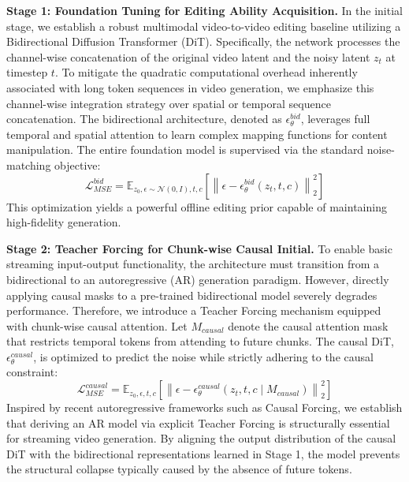 \noindent \textbf{Stage 1: Foundation Tuning for Editing Ability Acquisition.}
In the initial stage, we establish a robust multimodal video-to-video editing baseline utilizing a Bidirectional Diffusion Transformer (DiT). Specifically, the network processes the channel-wise concatenation of the original video latent and the noisy latent $z_t$ at timestep $t$. To mitigate the quadratic computational overhead inherently associated with long token sequences in video generation, we emphasize this channel-wise integration strategy over spatial or temporal sequence concatenation. The bidirectional architecture, denoted as $\epsilon_{\theta}^{bid}$, leverages full temporal and spatial attention to learn complex mapping functions for content manipulation. The entire foundation model is supervised via the standard noise-matching objective:
$$\mathcal{L}_{MSE}^{bid}=\mathbb{E}_{z_0,\epsilon\sim\mathcal{N}(0,I),t,c}\left[\left\|\epsilon-\epsilon_{\theta}^{bid}(z_t,t,c)\right\|_2^2\right]$$
This optimization yields a powerful offline editing prior capable of maintaining high-fidelity generation.

\noindent \textbf{Stage 2: Teacher Forcing for Chunk-wise Causal Initial.}
To enable basic streaming input-output functionality, the architecture must transition from a bidirectional to an autoregressive (AR) generation paradigm. However, directly applying causal masks to a pre-trained bidirectional model severely degrades performance. Therefore, we introduce a Teacher Forcing mechanism equipped with chunk-wise causal attention. Let $M_{causal}$ denote the causal attention mask that restricts temporal tokens from attending to future chunks. The causal DiT, $\epsilon_{\theta}^{causal}$, is optimized to predict the noise while strictly adhering to the causal constraint:
$$\mathcal{L}_{MSE}^{causal}=\mathbb{E}_{z_0,\epsilon,t,c}\left[\left\|\epsilon-\epsilon_{\theta}^{causal}(z_t,t,c\mid M_{causal})\right\|_2^2\right]$$
Inspired by recent autoregressive frameworks such as Causal Forcing, we establish that deriving an AR model via explicit Teacher Forcing is structurally essential for streaming video generation. By aligning the output distribution of the causal DiT with the bidirectional representations learned in Stage 1, the model prevents the structural collapse typically caused by the absence of future tokens.

